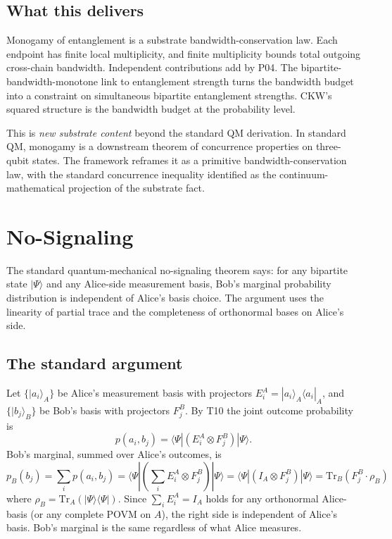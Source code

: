 \documentclass[11pt,a4paper]{article}
\begin{document}
\subsection{What this delivers}

Monogamy of entanglement is a substrate bandwidth-conservation law. Each endpoint has finite local multiplicity, and finite multiplicity bounds total outgoing cross-chain bandwidth. Independent contributions add by P04. The bipartite-bandwidth-monotone link to entanglement strength turns the bandwidth budget into a constraint on simultaneous bipartite entanglement strengths. CKW's squared structure is the bandwidth budget at the probability level.

This is \emph{new substrate content} beyond the standard QM derivation. In standard QM, monogamy is a downstream theorem of concurrence properties on three-qubit states. The framework reframes it as a primitive bandwidth-conservation law, with the standard concurrence inequality identified as the continuum-mathematical projection of the substrate fact.

\section{No-Signaling}

The standard quantum-mechanical no-signaling theorem says: for any bipartite state $|\Psi\rangle$ and any Alice-side measurement basis, Bob's marginal probability distribution is independent of Alice's basis choice. The argument uses the linearity of partial trace and the completeness of orthonormal bases on Alice's side.

\subsection{The standard argument}

Let $\{|a_i\rangle_A\}$ be Alice's measurement basis with projectors $E_i^A = |a_i\rangle_A\langle a_i|_A$, and $\{|b_j\rangle_B\}$ be Bob's basis with projectors $F_j^B$. By T10 the joint outcome probability is
\[
p(a_i, b_j) = \langle\Psi|(E_i^A \otimes F_j^B)|\Psi\rangle.
\]
Bob's marginal, summed over Alice's outcomes, is
\[
p_B(b_j) = \sum_i p(a_i, b_j) = \langle\Psi|(\textstyle\sum_i E_i^A \otimes F_j^B)|\Psi\rangle = \langle\Psi|(I_A \otimes F_j^B)|\Psi\rangle = \mathrm{Tr}_B(F_j^B \cdot \rho_B)
\]
where $\rho_B = \mathrm{Tr}_A(|\Psi\rangle\langle\Psi|)$. Since $\sum_i E_i^A = I_A$ holds for any orthonormal Alice-basis (or any complete POVM on $A$), the right side is independent of Alice's basis. Bob's marginal is the same regardless of what Alice measures.
\end{document}
